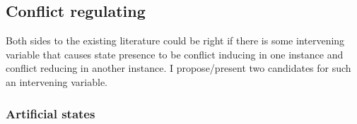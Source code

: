 \documentclass[12pt]{article}
\begin{document}
\subsection{Conflict regulating}


Both sides to the existing literature could be right if there is some
intervening variable that causes state presence to be conflict inducing in one
instance and conflict reducing in another instance. I propose/present two
candidates for such an intervening variable.

\subsubsection{Artificial states}
\end{document}
